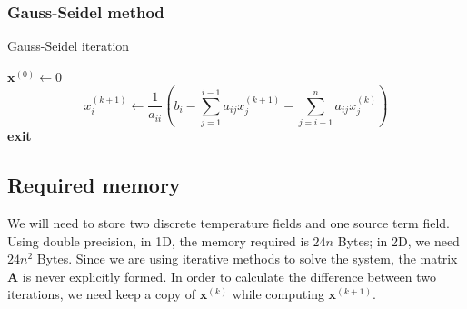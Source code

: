 \documentclass{article}
\begin{document}
\subsubsection{Gauss-Seidel method}
\begin{algorithm}[H]
\caption{Gauss-Seidel iteration}
\begin{algorithmic}
\STATE $\bm x^{(0)} \leftarrow 0$
\STATE $$x_i^{(k+1)} \leftarrow \frac{1}{a_{ii}}\left(b_i - \sum_{j=1}^{i-1} a_{ij}x_j^{(k+1)}
    - \sum_{j=i+1}^n a_{ij}x_j^{(k)}\right)$$
\STATE       \textbf{exit}
    \ENDIF
\ENDFOR
\end{algorithmic}
\end{algorithm}

\subsection{Required memory}
We will need to store two discrete temperature fields and one source term field. Using double precision, in 1D,
the memory required is $24n$ Bytes; in 2D, we need $24n^2$ Bytes. Since we are using iterative methods
to solve the system, the matrix $\bm A$ is never explicitly formed. In order to calculate the 
difference between two iterations, we need keep a copy of $\bm x^{(k)}$ while computing $\bm x^{(k+1)}$.
\end{document}
